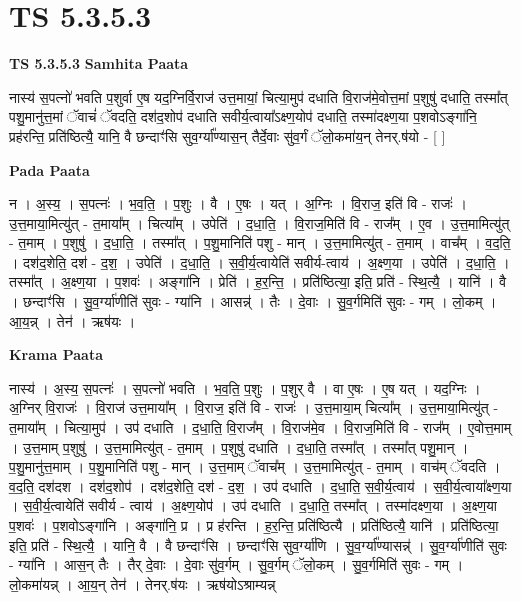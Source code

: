 \documentclass[17pt]{extarticle}
\begin{document}
\section{ TS 5.3.5.3 }

\textbf{TS 5.3.5.3 } \newline
\textbf{Samhita Paata} \newline

नास्य॑ स॒पत्नो॑ भवति प॒शुर्वा ए॒ष यद॒ग्निर्वि॒राज॑ उत्त॒मायां॒ चित्या॒मुप॑ दधाति वि॒राज॑मे॒वोत्त॒मां प॒शुषु॑ दधाति॒ तस्मा᳚त् पशु॒मानु॑त्त॒मां ॅवाचं॑ ॅवदति॒ दश॑द॒शोप॑ दधाति सवीर्य॒त्वाया᳚ऽक्ष्ण॒योप॑ दधाति॒ तस्मा॑दक्ष्ण॒या प॒शवोऽङ्गा॑नि॒ प्रह॑रन्ति॒ प्रति॑ष्ठित्यै॒ यानि॒ वै छन्दाꣳ॑सि सुव॒र्ग्या᳚ण्यास॒न् तैर्दे॒वाः सु॑व॒र्गं ॅलो॒कमा॑य॒न् तेनर्.ष॑यो - [  ] \newline

\textbf{Pada Paata} \newline

न । अ॒स्य॒ । स॒पत्नः॑ । भ॒व॒ति॒ । प॒शुः । वै । ए॒षः । यत् । अ॒ग्निः । वि॒राज॒ इति॑ वि - राजः॑ । उ॒त्त॒माया॒मित्यु॑त् - त॒माया᳚म् । चित्या᳚म् । उपेति॑ । द॒धा॒ति॒ । वि॒राज॒मिति॑ वि - राज᳚म् । ए॒व । उ॒त्त॒मामित्यु॑त् - त॒माम् । प॒शुषु॑ । द॒धा॒ति॒ । तस्मा᳚त् । प॒शु॒मानिति॑ पशु - मान् । उ॒त्त॒मामित्यु॑त् - त॒माम् । वाच᳚म् । व॒द॒ति॒ । दश॑द॒शेति॒ दश॑ - द॒श॒ । उपेति॑ । द॒धा॒ति॒ । स॒वी॒र्य॒त्वायेति॑ सवीर्य-त्वाय॑ । अ॒क्ष्ण॒या । उपेति॑ । द॒धा॒ति॒ । तस्मा᳚त् । अ॒क्ष्ण॒या । प॒शवः॑ । अङ्गा॑नि । प्रेति॑ । ह॒र॒न्ति॒ । प्रति॑ष्ठित्या॒ इति॒ प्रति॑ - स्थि॒त्यै॒ । यानि॑ । वै । छन्दाꣳ॑सि । सु॒व॒र्ग्या॑णीति॑ सुवः - ग्या॑नि । आसन्न्॑ । तैः । दे॒वाः । सु॒व॒र्गमिति॑ सुवः - गम् । लो॒कम् । आ॒य॒न्न् । तेन॑ । ऋष॑यः ।  \newline


\textbf{Krama Paata} \newline

नास्य॑ । अ॒स्य॒ स॒पत्नः॑ । स॒पत्नो॑ भवति । भ॒व॒ति॒ प॒शुः । 
प॒शुर् वै । वा ए॒षः । ए॒ष यत् । यद॒ग्निः । अ॒ग्निर् वि॒राजः॑ । वि॒राज॑ उत्त॒माया᳚म् । वि॒राज॒ इति॑ वि - राजः॑ । उ॒त्त॒माया॒म् चित्या᳚म् । उ॒त्त॒माया॒मित्यु॑त् - त॒माया᳚म् । 
चित्या॒मुप॑ । उप॑ दधाति । द॒धा॒ति॒ वि॒राज᳚म् । वि॒राज॑मे॒व । वि॒राज॒मिति॑ वि - राज᳚म् । ए॒वोत्त॒माम् । उ॒त्त॒माम् प॒शुषु॑ । उ॒त्त॒मामित्यु॑त् - त॒माम् । प॒शुषु॑ दधाति । द॒धा॒ति॒ तस्मा᳚त् । तस्मा᳚त् पशु॒मान् । प॒शु॒मानु॑त्त॒माम् । प॒शु॒मानिति॑ पशु - मान् । उ॒त्त॒माम् ॅवाच᳚म् । उ॒त्त॒मामित्यु॑त् - त॒माम् । वाच॑म् ॅवदति । व॒द॒ति॒ दश॑दश । दश॑द॒शोप॑ । दश॑द॒शेति॒ दश॑ - द॒श॒ । उप॑ दधाति । द॒धा॒ति॒ स॒वी॒र्य॒त्वाय॑ । स॒वी॒र्य॒त्वाया᳚क्ष्ण॒या । स॒वी॒र्य॒त्वायेति॑ सवीर्य - त्वाय॑ । अ॒क्ष्ण॒योप॑ । उप॑ दधाति । द॒धा॒ति॒ तस्मा᳚त् । तस्मा॑दक्ष्ण॒या । अ॒क्ष्ण॒या प॒शवः॑ । प॒शवोऽङ्गा॑नि । अङ्गा॑नि॒ प्र । प्र ह॑रन्ति । ह॒र॒न्ति॒ प्रति॑ष्ठित्यै । प्रति॑ष्ठित्यै॒ यानि॑ । प्रति॑ष्ठित्या॒ इति॒ प्रति॑ - स्थि॒त्यै॒ । यानि॒ वै । वै छन्दाꣳ॑सि । छन्दाꣳ॑सि सुव॒र्ग्या॑णि । सु॒व॒र्ग्या᳚ण्यासन्न्॑ । सु॒व॒र्ग्या॑णीति॑ सुवः - ग्या॑नि । आस॒न् तैः । तैर् दे॒वाः । दे॒वाः सु॑व॒र्गम् । सु॒व॒र्गम् ॅलो॒कम् । सु॒व॒र्गमिति॑ सुवः - गम् । लो॒कमा॑यन्न् । आ॒य॒न् तेन॑ । तेनर्.ष॑यः । ऋष॑योऽश्राम्यन्न् \newline
\end{document}

